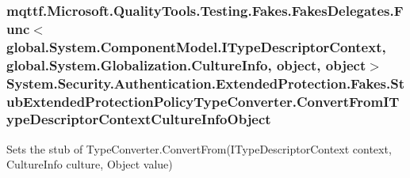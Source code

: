 \hypertarget{class_system_1_1_security_1_1_authentication_1_1_extended_protection_1_1_fakes_1_1_stub_extendedf67afed15bbc0df07bfc91316f6f81f0_ac051a01d2e59aca51a8e51984aa5fb41}{
\subsubsection[{Convert\-From\-I\-Type\-Descriptor\-Context\-Culture\-Info\-Object}]{\setlength{\rightskip}{0pt plus 5cm}mqttf.\-Microsoft.\-Quality\-Tools.\-Testing.\-Fakes.\-Fakes\-Delegates.\-Func$<$global.\-System.\-Component\-Model.\-I\-Type\-Descriptor\-Context, global.\-System.\-Globalization.\-Culture\-Info, object, object$>$ System.\-Security.\-Authentication.\-Extended\-Protection.\-Fakes.\-Stub\-Extended\-Protection\-Policy\-Type\-Converter.\-Convert\-From\-I\-Type\-Descriptor\-Context\-Culture\-Info\-Object}}\label{class_system_1_1_security_1_1_authentication_1_1_extended_protection_1_1_fakes_1_1_stub_extendedf67afed15bbc0df07bfc91316f6f81f0_ac051a01d2e59aca51a8e51984aa5fb41}


Sets the stub of Type\-Converter.\-Convert\-From(\-I\-Type\-Descriptor\-Context context, Culture\-Info culture, Object value)

